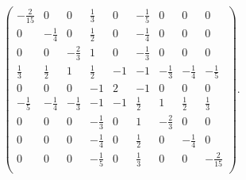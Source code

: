 \documentclass{amsart}
\begin{document}
$$
\left(
\begin{array}{ccccccccc}
 -\frac{2}{15} & 0 & 0 & \frac{1}{3} & 0 & -\frac{1}{5} & 0 & 0 & 0 \\
 0 & -\frac{1}{4} & 0 & \frac{1}{2} & 0 & -\frac{1}{4} & 0 & 0 & 0 \\
 0 & 0 & -\frac{2}{3} & 1 & 0 & -\frac{1}{3} & 0 & 0 & 0 \\
 \frac{1}{3} & \frac{1}{2} & 1 & \frac{1}{2} & -1 & -1 & -\frac{1}{3} & -\frac{1}{4} & -\frac{1}{5} \\
 0 & 0 & 0 & -1 & 2 & -1 & 0 & 0 & 0 \\
 -\frac{1}{5} & -\frac{1}{4} & -\frac{1}{3} & -1 & -1 & \frac{1}{2} & 1 & \frac{1}{2} & \frac{1}{3} \\
 0 & 0 & 0 & -\frac{1}{3} & 0 & 1 & -\frac{2}{3} & 0 & 0 \\
 0 & 0 & 0 & -\frac{1}{4} & 0 & \frac{1}{2} & 0 & -\frac{1}{4} & 0 \\
 0 & 0 & 0 & -\frac{1}{5} & 0 & \frac{1}{3} & 0 & 0 & -\frac{2}{15} \\
\end{array}
\right).
$$
\end{document}
